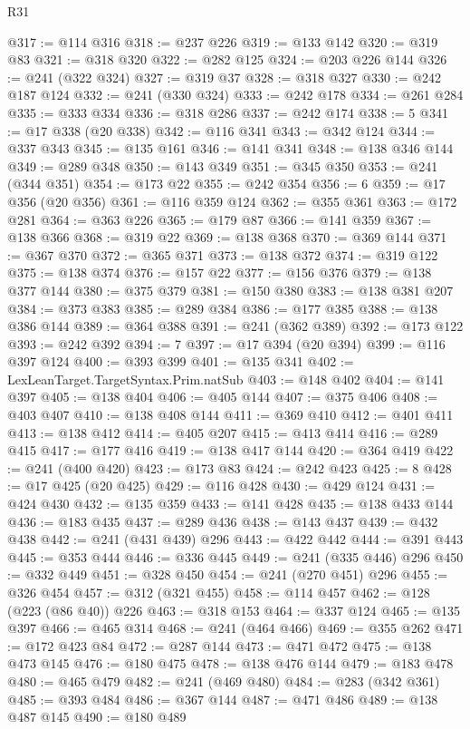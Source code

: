 \begin{lexlean}{R31}
\begin{coremodule}
@317 := @114 @316
@318 := @237 @226
@319 := @133 @142
@320 := @319 @83
@321 := @318 @320
@322 := @282 @125
@324 := @203 @226 @144
@326 := @241 (@322 @324)
@327 := @319 @37
@328 := @318 @327
@330 := @242 @187 @124
@332 := @241 (@330 @324)
@333 := @242 @178
@334 := @261 @284
@335 := @333 @334
@336 := @318 @286
@337 := @242 @174
@338 := 5
@341 := @17 @338 (@20 @338)
@342 := @116 @341
@343 := @342 @124
@344 := @337 @343
@345 := @135 @161
@346 := @141 @341
@348 := @138 @346 @144
@349 := @289 @348
@350 := @143 @349
@351 := @345 @350
@353 := @241 (@344 @351)
@354 := @173 @22
@355 := @242 @354
@356 := 6
@359 := @17 @356 (@20 @356)
@361 := @116 @359 @124
@362 := @355 @361
@363 := @172 @281
@364 := @363 @226
@365 := @179 @87
@366 := @141 @359
@367 := @138 @366
@368 := @319 @22
@369 := @138 @368
@370 := @369 @144
@371 := @367 @370
@372 := @365 @371
@373 := @138 @372
@374 := @319 @122
@375 := @138 @374
@376 := @157 @22
@377 := @156 @376
@379 := @138 @377 @144
@380 := @375 @379
@381 := @150 @380
@383 := @138 @381 @207
@384 := @373 @383
@385 := @289 @384
@386 := @177 @385
@388 := @138 @386 @144
@389 := @364 @388
@391 := @241 (@362 @389)
@392 := @173 @122
@393 := @242 @392
@394 := 7
@397 := @17 @394 (@20 @394)
@399 := @116 @397 @124
@400 := @393 @399
@401 := @135 @341
@402 := LexLeanTarget.TargetSyntax.Prim.natSub
@403 := @148 @402
@404 := @141 @397
@405 := @138 @404
@406 := @405 @144
@407 := @375 @406
@408 := @403 @407
@410 := @138 @408 @144
@411 := @369 @410
@412 := @401 @411
@413 := @138 @412
@414 := @405 @207
@415 := @413 @414
@416 := @289 @415
@417 := @177 @416
@419 := @138 @417 @144
@420 := @364 @419
@422 := @241 (@400 @420)
@423 := @173 @83
@424 := @242 @423
@425 := 8
@428 := @17 @425 (@20 @425)
@429 := @116 @428
@430 := @429 @124
@431 := @424 @430
@432 := @135 @359
@433 := @141 @428
@435 := @138 @433 @144
@436 := @183 @435
@437 := @289 @436
@438 := @143 @437
@439 := @432 @438
@442 := @241 (@431 @439) @296
@443 := @422 @442
@444 := @391 @443
@445 := @353 @444
@446 := @336 @445
@449 := @241 (@335 @446) @296
@450 := @332 @449
@451 := @328 @450
@454 := @241 (@270 @451) @296
@455 := @326 @454
@457 := @312 (@321 @455)
@458 := @114 @457
@462 := @128 (@223 (@86 @40)) @226
@463 := @318 @153
@464 := @337 @124
@465 := @135 @397
@466 := @465 @314
@468 := @241 (@464 @466)
@469 := @355 @262
@471 := @172 @423 @84
@472 := @287 @144
@473 := @471 @472
@475 := @138 @473 @145
@476 := @180 @475
@478 := @138 @476 @144
@479 := @183 @478
@480 := @465 @479
@482 := @241 (@469 @480)
@484 := @283 (@342 @361)
@485 := @393 @484
@486 := @367 @144
@487 := @471 @486
@489 := @138 @487 @145
@490 := @180 @489

\end{coremodule}
\end{lexlean}
